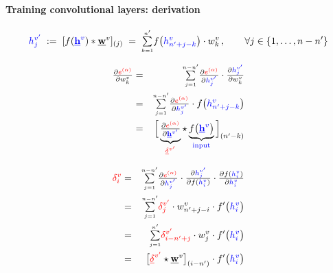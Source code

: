 \paragraph{Training convolutional layers: derivation}			
	$$
		{\color{blue}h_j^{v'}}
		\;:=\; [ f({\color{blue}\underline{\mathbf{h}}^v}) * \underline{\mathbf{w}}^{v} ]_{(j)}
		\;=\; {\textstyle \sum\limits_{\scriptscriptstyle k=1}^{\scriptscriptstyle n'}} f\big({\color{blue}h^{v}_{n'+j-k}}\big) 
			\cdot w_k^v  \,,
		\qquad \forall j \in \{1, \ldots, n-n'\}
	$$
	\vspace{4mm}
	\begin{minipage}{\textwidth} \footnotesize
		\begin{minipage}[t]{5.25cm}
			\vspace{-4mm}
			\begin{eqnarray*}
				\smallfrac{\partial {\color{red}e^{(\alpha)}}}
					{\partial w_{k}^{v}}
				&=& \smallsum{j=1}{n-n'}
					\smallfrac{\partial{\color{red} e^{(\alpha)}}}
						{\partial {\color{blue}h_j^{v'}}}
					\cdot \smallfrac{\partial {\color{blue}h_j^{v'}}}
						{\partial w_{k}^{v}} \\
				&=& \smallsum{j=1}{n-n'}
					\smallfrac{\partial {\color{red}{e^{(\alpha)}}}}%
						{\partial {\color{blue}h_j^{v'}}}
					\cdot f\big({\color{blue}h^{v}_{n'+j-k}}\big) \\
				&=& \Big[ \underbrace{ 
						\smallfrac{\partial {\color{red}e^{(\alpha)}}}%
						{\partial {\color{blue}\vec h^{v'}}} 
					}_{{\color{red}\vec \delta^{v'}}} 
					\star \underbrace{
						f\big({\color{blue}\vec h^{v}}\big)
					}_{\text{\color{blue}input}} \Big]_{(n'-k)}
			\end{eqnarray*}		
		\end{minipage}
		\hfill
		\begin{minipage}[t]{5.5cm}
			\vspace{-4mm}
			\begin{eqnarray*}
				{\color{red}\delta_i^{v}}
				&=& \smallsum{j=1}{n-n'}
					\smallfrac{\partial {\color{red}e^{(\alpha)}}}%
						{\partial {\color{blue}h^{v'}_j}}
					\cdot \smallfrac{\partial {\color{blue}h_j^{v'}}}
						{\partial f({\color{blue}h_i^{v}})}
					\cdot \smallfrac{\partial f({\color{blue}h_i^{v}})}
						{\partial {\color{blue}h_i^{v}}} \\
				&=& \smallsum{j=1}{n-n'}
					{\color{red}\delta_j^{v'}}
					\cdot w^{v}_{n'+j-i}
					\cdot f'\big( {\color{blue}h_i^{v}} \big) \\
				&=& \smallsum{j=1}{n'}
					{\color{red}\delta_{i-n'+j}^{v'}}
					\cdot w^{v}_{j}
					\cdot f'\big( {\color{blue}h_i^{v}} \big) \\
				&=& \big[ {\color{red}\vec \delta^{v'}}  
							\star \vec w^{v} 
						\big]_{(i-n')}
					\cdot f'\big( {\color{blue}h_i^{v}} \big)
			\end{eqnarray*}				
		\end{minipage}
	\end{minipage}
